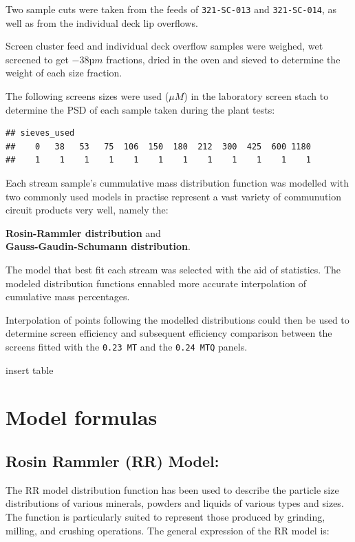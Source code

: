 \documentclass[
]{article}
\begin{document}
Two sample cuts were taken from the feeds of \texttt{321-SC-013} and
\texttt{321-SC-014}, as well as from the individual deck lip overflows.

Screen cluster feed and individual deck overflow samples were weighed,
wet screened to get \(-38 µm\) fractions, dried in the oven and sieved
to determine the weight of each size fraction.

The following screens sizes were used (\(\mu M\)) in the laboratory
screen stach to determine the PSD of each sample taken during the plant
tests:

\begin{verbatim}
## sieves_used
##    0   38   53   75  106  150  180  212  300  425  600 1180 
##    1    1    1    1    1    1    1    1    1    1    1    1
\end{verbatim}

Each stream sample's cummulative mass distribution function was modelled
with two commonly used models in practise represent a vast variety of
communution circuit products very well, namely the:

\textbf{Rosin-Rammler distribution} and\\
\textbf{Gauss-Gaudin-Schumann distribution}.

The model that best fit each stream was selected with the aid of
statistics. The modeled distribution functions ennabled more accurate
interpolation of cumulative mass percentages.

Interpolation of points following the modelled distributions could then
be used to determine screen efficiency and subsequent efficiency
comparison between the screens fitted with the \texttt{0.23\ MT} and the
\texttt{0.24\ MTQ} panels.

insert table

\hypertarget{model-formulas}{%
\section{Model formulas}\label{model-formulas}}

\hypertarget{rosin-rammler-rr-model}{%
\subsection{Rosin Rammler (RR) Model:}\label{rosin-rammler-rr-model}}

The RR model distribution function has been used to describe the
particle size distributions of various minerals, powders and liquids of
various types and sizes. The function is particularly suited to
represent those produced by grinding, milling, and crushing operations.
The general expression of the RR model is:
\end{document}
